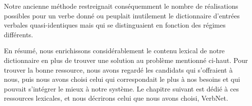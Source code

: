 Notre ancienne méthode restreignait conséquemment le nombre de réalisations possibles pour un verbe donné ou peuplait inutilement le dictionnaire d'entrées verbales quasi-identiques mais qui se distinguaient en fonction des régimes différents. 

En résumé, nous enrichissons considérablement le contenu lexical de notre dictionnaire en plus de trouver une solution au problème mentionné ci-haut. Pour trouver la bonne ressource, nous avons regardé les candidats qui s'offraient à nous, puis nous avons choisi celui qui correspondait le plus à nos besoins et qui pouvait s'intégrer le mieux à notre système. Le chapitre suivant est dédié à ces ressources lexicales, et nous décrirons celui que nous avons choisi, VerbNet.

